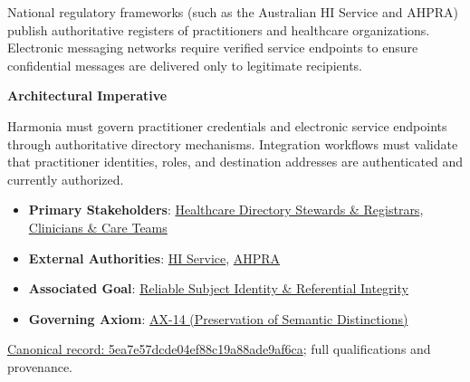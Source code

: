 National regulatory frameworks (such as the Australian HI Service and AHPRA) publish authoritative registers of practitioners and healthcare organizations. Electronic messaging networks require verified service endpoints to ensure confidential messages are delivered only to legitimate recipients.



\par\medskip\textbf{Architectural Imperative}\par


Harmonia must govern practitioner credentials and electronic service endpoints through authoritative directory mechanisms. Integration workflows must validate that practitioner identities, roles, and destination addresses are authenticated and currently authorized.



\begin{itemize}


\item \textbf{Primary Stakeholders}: \href{\detokenize{../../../../../../../../../docs/markdown/01-motivation/stakeholders/enterprise-stakeholders.md}}{Healthcare Directory Stewards \& Registrars}, \href{\detokenize{../../../../../../../../../docs/markdown/01-motivation/stakeholders/enterprise-stakeholders.md}}{Clinicians \& Care Teams}

\item \textbf{External Authorities}: \href{\detokenize{../../../../../../../../../docs/markdown/01-motivation/stakeholders/external-authorities.md}}{HI Service}, \href{\detokenize{../../../../../../../../../docs/markdown/01-motivation/stakeholders/external-authorities.md}}{AHPRA}

\item \textbf{Associated Goal}: \href{\detokenize{../../../../../../../../../docs/markdown/01-motivation/goals-outcomes/strategic-goals.md}}{Reliable Subject Identity \& Referential Integrity}

\item \textbf{Governing Axiom}: \hyperref[element:d3fc6025dc7646d1b2020b51f7a44bfa]{AX-14 (Preservation of Semantic Distinctions)}

\end{itemize}

{\footnotesize \href{../../../../../../../../continuum/motivation/driver/5ea7e57dcde04ef88c19a88ade9af6ca.md}{Canonical record: 5ea7e57dcde04ef88c19a88ade9af6ca}; full qualifications and provenance.}\par
